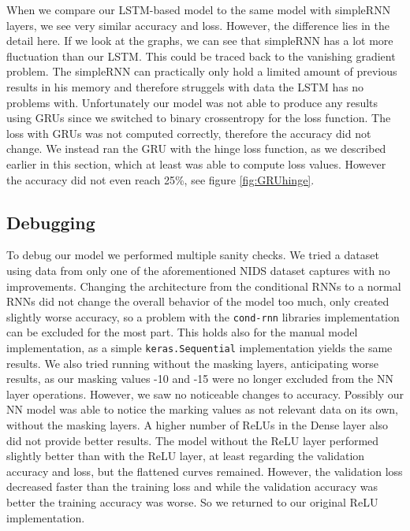 \documentclass[
	ngerman,
	ruledheaders=section,%
	class=report,%
	thesis={type=bachelor},%
	accentcolor=9c,%
	custommargins=true,%
	marginpar=false,%
	parskip=half-,%
	fontsize=11pt,%
]{tudapub}
\let\code\texttt
\begin{document}
When we compare our LSTM-based model to the same model with simpleRNN layers, we see very similar accuracy and loss.
However, the difference lies in the detail here.
If we look at the graphs, we can see that simpleRNN has a lot more fluctuation than our LSTM.
This could be traced back to the vanishing gradient problem.
The simpleRNN can practically only hold a limited amount of previous results in his memory and therefore struggels with data the LSTM has no problems with.
Unfortunately our model was not able to produce any results using GRUs since we switched to binary crossentropy for the loss function.
The loss with GRUs was not computed correctly, therefore the accuracy did not change.
We instead ran the GRU with the hinge loss function, as we described earlier in this section, which at least was able to compute loss values.
However the accuracy did not even reach 25\%, see figure \ref{fig:GRUhinge}.

\subsection{Debugging}

To debug our model we performed multiple sanity checks.
We tried a dataset using data from only one of the aforementioned NIDS dataset captures with no improvements.
Changing the architecture from the conditional RNNs to a normal RNNs did not change the overall behavior of the model too much, only created slightly worse accuracy, so a problem with the \code{cond-rnn} libraries implementation can be excluded for the most part.
This holds also for the manual model implementation, as a simple \code{keras.Sequential} implementation yields the same results.
We also tried running without the masking layers, anticipating worse results, as our masking values -10 and -15 were no longer excluded from the NN layer operations.
However, we saw no noticeable changes to accuracy.
Possibly our NN model was able to notice the marking values as not relevant data on its own, without the masking layers.
A higher number of ReLUs in the Dense layer also did not provide better results.
The model without the ReLU layer performed slightly better than with the ReLU layer,
at least regarding the validation accuracy and loss, but the flattened curves remained. %
However, the validation loss decreased faster than the training loss and while the validation accuracy was better the training accuracy was worse.
So we returned to our original ReLU implementation.
\end{document}
